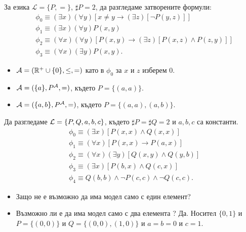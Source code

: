 \begin{example}
  За езика $\mathcal{L} = \{P,=\}$, $\sharp P = 2$, да разгледаме затворените формули:
  \begin{align*}
    & \phi_0 \equiv (\exists x)(\forall y)[x \neq y \to (\exists z)[\neg P(y,z)]]\\
    & \phi_1 \equiv (\exists x)(\forall y)P(x,y)\\
    & \phi_2 \equiv (\forall x)(\forall y)[P(x,y) \to (\exists z)[P(x,z) \land P(z,y)]]\\
    & \phi_3 \equiv (\forall x)(\exists y)P(x,y).
  \end{align*}
\end{example}
\begin{hint}
  \begin{itemize}
  \item
    $\mathcal{A} = (\mathbb{R}^+ \cup \{0\}, \leq, =)$ като в $\phi_0$ за $x$ и $z$ изберем $0$.
  \item
    $\mathcal{A} = (\{a\}, P^{\mathcal{A}},=)$, където $P = \{(a,a)\}$.
  \item
    $\mathcal{A} = (\{a,b\}, P^{\mathcal{A}},=)$, където $P = \{(a,a), (a,b)\}$.
  \end{itemize}
\end{hint}


\begin{example}
  Да разгледаме $\mathcal{L} = \{P,Q,a,b,c\}$, където $\sharp P = \sharp Q = 2$ и $a,b,c$ са константи.
  \begin{align*}
    & \phi_0 \equiv (\exists x)[P(x,x) \land Q(x,x)]\\
    & \phi_1 \equiv (\forall x)[P(x,x) \to P(a,x)]\\
    & \phi_2 \equiv (\forall x)(\exists y)[Q(x,y) \land Q(y,b)]\\
    & \phi_3 \equiv (\exists x)[P(b,x) \land Q(c,x)]\\
    & \phi_4 \equiv Q(b,b) \land \neg P(c,c) \land \neg Q(c,c).
  \end{align*}
\end{example}
\begin{hint}
  \begin{itemize}
  \item
    Защо не е възможно да има модел само с един елемент?
  \item
    Възможно ли е да има модел само с два елемента ? Да.
    Носител $\{0,1\}$ и $P = \{(0,0)\}$ и $Q = \{(0,0),(1,0)\}$ и $a = b = 0$ и $c = 1$.
  \end{itemize}
\end{hint}

